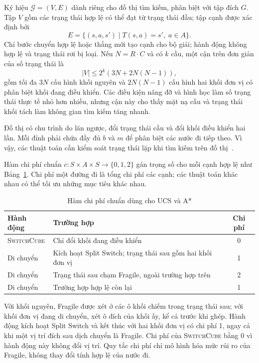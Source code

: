 Ký hiệu $\mathcal{G}=(V,E)$ dành riêng cho đồ thị tìm kiếm, phân biệt với tập
đích $G$. Tập $V$ gồm các trạng thái hợp lệ có thể đạt từ trạng thái đầu; tập
cạnh được xác định bởi
\begin{equation}
E=\{(s,a,s')\mid T(s,a)=s',\;a\in A\}.
\end{equation}
Chỉ bước chuyển hợp lệ hoặc thắng mới tạo cạnh cho bộ giải; hành động không
hợp lệ và trạng thái rơi bị loại. Nếu $N=R\cdot C$ và có $k$ cầu, một cận trên
đơn giản của số trạng thái là
\begin{equation}
|V|\leq 2^k\left(3N+2N(N-1)\right),
\end{equation}
gồm tối đa $3N$ cấu hình khối nguyên và $2N(N-1)$ cấu hình hai khối đơn vị có
phân biệt khối đang điều khiển. Các điều kiện nâng đỡ và hình học làm số trạng
thái thực tế nhỏ hơn nhiều, nhưng cận này cho thấy mặt nạ cầu và trạng thái
khối tách làm không gian tìm kiếm tăng nhanh.

Đồ thị có chu trình do lăn ngược, đổi trạng thái cầu và đổi khối điều khiển hai
lần. Mỗi đỉnh phải chứa đầy đủ $b$ và $m$ để phân biệt các nước đi tiếp theo.
Vì vậy, các thuật toán cần kiểm soát trạng thái lặp khi tìm kiếm trên đồ
thị~\cite{russell2021}.

Hàm chi phí chuẩn $c:S\times A\times S\rightarrow\{0,1,2\}$ gán trọng số
cho mỗi cạnh hợp lệ như Bảng~\ref{tab:cost}. Chi phí một đường đi là tổng chi
phí các cạnh; các thuật toán khác nhau có thể tối ưu những mục tiêu khác nhau.

\begin{table}[H]
\centering
\caption{Hàm chi phí chuẩn dùng cho UCS và A*}
\label{tab:cost}
\small
\begin{tabular}{@{}llc@{}}
\toprule
\textbf{Hành động} & \textbf{Trường hợp} & \textbf{Chi phí} \\
\midrule
\textsc{SwitchCube} & Chỉ đổi khối đang điều khiển & 0 \\
Di chuyển & Kích hoạt Split Switch; trạng thái sau gồm hai khối đơn vị & 1 \\
Di chuyển & Trạng thái sau chạm Fragile, ngoài trường hợp trên & 2 \\
Di chuyển & Trường hợp hợp lệ còn lại & 1 \\
\bottomrule
\end{tabular}
\end{table}

Với khối nguyên, Fragile được xét ở các ô khối chiếm trong trạng thái sau;
với khối đơn vị đang di chuyển, xét ô đích của khối ấy, kể cả trước khi ghép.
Hành động kích hoạt Split Switch và kết thúc với hai khối đơn vị có chi phí 1,
ngay cả khi một vị trí đích sau dịch chuyển là Fragile. Chi phí của
\textsc{SwitchCube} bằng 0 vì hành động này không đổi vị trí. Quy tắc chi phí
chỉ mô hình hóa mức rủi ro của Fragile, không thay đổi tính hợp lệ của nước đi.

